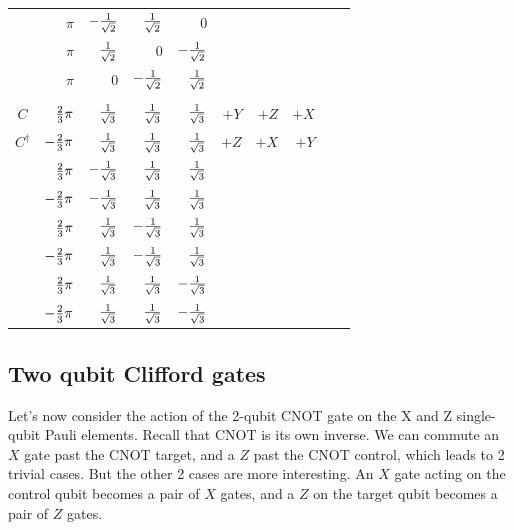 \begin{table}[htp]
\begin{center}
\begin{tabular}{crrrrrrrcc}
\\
						& $\pi$ 				& $-\sfrac{1}{\sqrt{2}}$ & $\sfrac{1}{\sqrt{2}}$ & 0 	&%
\\
						& $\pi$ 				& $\sfrac{1}{\sqrt{2}}$ &0 & $-\sfrac{1}{\sqrt{2}}$ 	&%
\\
						& $\pi$ 				& 0 & $-\sfrac{1}{\sqrt{2}}$ & $\sfrac{1}{\sqrt{2}}$ 	&%
\\
\\
$C$						& $\sfrac{2}{3}\pi$ 	& $\sfrac{1}{\sqrt{3}}$ & $\sfrac{1}{\sqrt{3}}$ & $\sfrac{1}{\sqrt{3}}$ & $+Y$ & $+Z$ & $+X$ \\
$C^\dagger$						& $-\sfrac{2}{3}\pi$	& $\sfrac{1}{\sqrt{3}}$ & $\sfrac{1}{\sqrt{3}}$ & $\sfrac{1}{\sqrt{3}}$ & $+Z$ & $+X$ & $+Y$ \\
						& $\sfrac{2}{3}\pi$		& $-\sfrac{1}{\sqrt{3}}$ & $\sfrac{1}{\sqrt{3}}$ & $\sfrac{1}{\sqrt{3}}$ & \\
						& $-\sfrac{2}{3}\pi$	& $-\sfrac{1}{\sqrt{3}}$ & $\sfrac{1}{\sqrt{3}}$ & $\sfrac{1}{\sqrt{3}}$ & \\

						& $\sfrac{2}{3}\pi$		& $\sfrac{1}{\sqrt{3}}$ & $-\sfrac{1}{\sqrt{3}}$ & $\sfrac{1}{\sqrt{3}}$ & \\
						& $-\sfrac{2}{3}\pi$	& $\sfrac{1}{\sqrt{3}}$ & $-\sfrac{1}{\sqrt{3}}$ & $\sfrac{1}{\sqrt{3}}$ & \\

						& $\sfrac{2}{3}\pi$		& $\sfrac{1}{\sqrt{3}}$ & $\sfrac{1}{\sqrt{3}}$ & $-\sfrac{1}{\sqrt{3}}$ & \\
						& $-\sfrac{2}{3}\pi$	& $\sfrac{1}{\sqrt{3}}$ & $\sfrac{1}{\sqrt{3}}$ & $-\sfrac{1}{\sqrt{3}}$ &
\end{tabular}
\end{center}
\end{table}%

\subsection{Two qubit Clifford gates}

Let's now consider the action of the 2-qubit CNOT gate on the X and Z single-qubit Pauli elements. Recall that CNOT is its own inverse. We can commute an $X$ gate past the CNOT target, and a $Z$ past the CNOT control, which leads to 2 trivial cases. But the other 2 cases are more interesting. An $X$ gate acting on the control qubit becomes a pair of $X$ gates, and a $Z$ on the target qubit becomes a pair of $Z$ gates.



